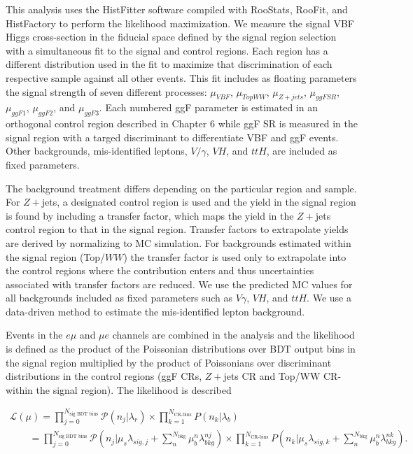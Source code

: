This analysis uses the HistFitter software compiled with RooStats, RooFit, and HistFactory to perform the likelihood maximization. We measure the signal VBF Higgs cross-section in the fiducial space defined by the signal region selection with a simultaneous fit to the signal and control regions. Each region has a different distribution used in the fit to maximize that discrimination of each respective sample against all other events. This fit includes as floating parameters the signal strength of seven different processes: $\mu_{VBF}$, $\mu_{TopWW}$, $\mu_{Z+jets}$, $\mu_{ggFSR}$, $\mu_{ggF1}$, $\mu_{ggF2}$, and $\mu_{ggF3}$. Each numbered ggF parameter is estimated in an orthogonal control region described in Chapter 6 while ggF SR is measured in the signal region with a targed discriminant to differentiate VBF and ggF events. Other backgrounds, mis-identified leptons, $V/\gamma$, $VH$, and $ttH$, are included as fixed parameters. 

The background treatment differs depending on the particular region and sample. For $Z+$jets, a designated control region is used and the yield in the signal region is found by including a transfer factor, which maps the yield in the $Z+$jets control region to that in the signal region. Transfer factors to extrapolate yields are derived by normalizing to MC simulation. For backgrounds estimated within the signal region (Top/$WW$) the transfer factor is used only to extrapolate into the control regions where the contribution enters and thus uncertainties associated with transfer factors are reduced. We use the predicted MC values for all backgrounds included as fixed parameters such as $V\gamma$, $VH$, and $ttH$. We use a data-driven method to estimate the mis-identified lepton background. 

Events in the $e\mu$ and $\mu e$ channels are combined in the analysis and the likelihood is defined as the product of the Poissonian distributions over BDT output bins in the signal region multiplied by the product of Poissonians over discriminant distributions in the control regions (ggF CRs, $Z+$jets CR and Top/WW CR- within the signal region). The likelihood is described 

\begin{equation}
  \begin{aligned}
\mathcal{L}(\mu) = \displaystyle\prod_{j=0}^{N_{\text{sig BDT bins}}} \mathcal{P} (n_{j}|\lambda_r) \times \displaystyle\prod_{k=1}^{N_{\text{CR-bins}}} P(n_{k}|\lambda_b) \\
\qquad = \displaystyle\prod_{j=0}^{N_{\text{sig BDT bins}}} \mathcal{P} (n_{j}|\mu_s \lambda_{sig,j} + \displaystyle\sum_{n}^{N_{\text{bkg}}}\mu_b^{n} \lambda_{bkg}^{nj}) \times \displaystyle\prod_{k=1}^{N_{\text{CR-bins}}} P(n_{k}|\mu_s \lambda_{sig,k} + \displaystyle\sum_{n}^{N_{\text{bkg}}}\mu_b^{n} \lambda_{bkg}^{nk}).
  \end{aligned}
\end{equation}

